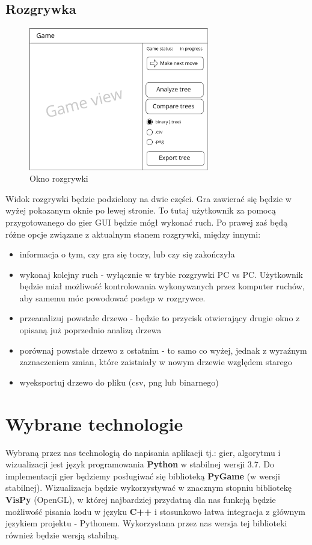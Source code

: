 \documentclass{article}
\let\oldsection\section
\renewcommand\section{\clearpage\oldsection}
\begin{document}
	\clearpage
	
	\subsection{Rozgrywka}
	\begin{figure}[h!]
		\centering
		\includegraphics[width=0.7\textwidth]{game-eps}
		\caption{Okno rozgrywki}
		\label{rys:game_view}
	\end{figure}

	\noindent Widok rozgrywki będzie podzielony na dwie części. Gra zawierać się będzie w wyżej pokazanym oknie po lewej stronie. To tutaj użytkownik za pomocą przygotowanego do gier GUI będzie mógł wykonać ruch. Po prawej zaś będą różne opcje związane z aktualnym stanem rozgrywki, między innymi:\\
	\begin{itemize}
		\item informacja o tym, czy gra się toczy, lub czy się zakończyła
		\item wykonaj kolejny ruch - wyłącznie w trybie rozgrywki PC vs PC. Użytkownik będzie miał możliwość kontrolowania wykonywanych przez komputer ruchów, aby samemu móc powodować postęp w rozgrywce.
		\item przeanalizuj powstałe drzewo - będzie to przycisk otwierający drugie okno z opisaną już poprzednio analizą drzewa
		\item porównaj powstałe drzewo z ostatnim - to samo co wyżej, jednak z wyraźnym zaznaczeniem zmian, które zaistniały w nowym drzewie względem starego
		\item wyeksportuj drzewo do pliku (csv, png lub binarnego)
	\end{itemize}
	
	
	\section{Wybrane technologie}
	Wybraną przez nas technologią do napisania aplikacji tj.: gier, algorytmu i wizualizacji jest język programowania \textbf{Python} w stabilnej wersji 3.7. Do implementacji gier będziemy posługiwać się biblioteką \textbf{PyGame} (w wersji stabilnej). Wizualizacja będzie wykorzystywać w znacznym stopniu bibliotekę \textbf{VisPy} (OpenGL), w której najbardziej przydatną dla nas funkcją będzie możliwość pisania kodu w języku \textbf{C++} i stosunkowo łatwa integracja z głównym językiem projektu - Pythonem. Wykorzystana przez nas wersja tej biblioteki również będzie wersją stabilną.\\
	
\end{document}
